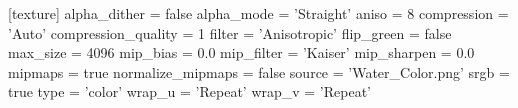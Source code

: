 [texture]
alpha_dither = false
alpha_mode = 'Straight'
aniso = 8
compression = 'Auto'
compression_quality = 1
filter = 'Anisotropic'
flip_green = false
max_size = 4096
mip_bias = 0.0
mip_filter = 'Kaiser'
mip_sharpen = 0.0
mipmaps = true
normalize_mipmaps = false
source = 'Water_Color.png'
srgb = true
type = 'color'
wrap_u = 'Repeat'
wrap_v = 'Repeat'